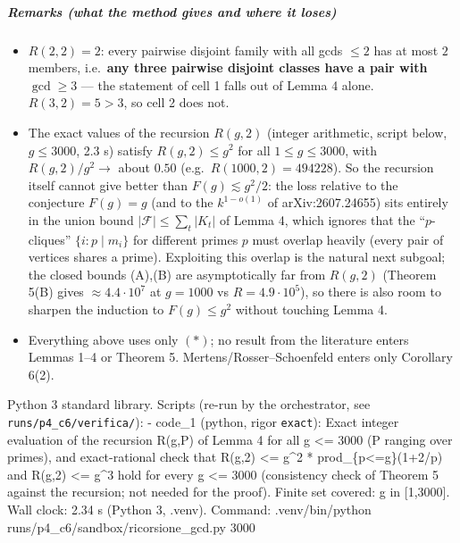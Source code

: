 \subparagraph{Remarks (what the method gives and where it
loses)}\label{remarks-what-the-method-gives-and-where-it-loses}

\begin{itemize}
\tightlist
\item
  \(R(2,2)=2\): every pairwise disjoint family with all gcds \(\le2\)
  has at most \(2\) members, i.e.~\textbf{any three pairwise disjoint
  classes have a pair with \(\gcd\ge3\)} --- the statement of cell 1
  falls out of Lemma 4 alone. \(R(3,2)=5>3\), so cell 2 does not.
\item
  The exact values of the recursion \(R(g,2)\) (integer arithmetic,
  script below, \(g\le3000\), 2.3 s) satisfy \(R(g,2)\le g^2\) for all
  \(1\le g\le 3000\), with \(R(g,2)/g^2\to\) about \(0.50\)
  (e.g.~\(R(1000,2)=494228\)). So the recursion itself cannot give
  better than \(F(g)\lesssim g^2/2\): the loss relative to the
  conjecture \(F(g)=g\) (and to the \(k^{1-o(1)}\) of arXiv:2607.24655)
  sits entirely in the union bound \(|\mathcal F|\le\sum_t|K_t|\) of
  Lemma 4, which ignores that the ``\(p\)-cliques'' \(\{i:p\mid m_i\}\)
  for different primes \(p\) must overlap heavily (every pair of
  vertices shares a prime). Exploiting this overlap is the natural next
  subgoal; the closed bounds (A),(B) are asymptotically far from
  \(R(g,2)\) (Theorem 5(B) gives \(\approx 4.4\cdot10^7\) at \(g=1000\)
  vs \(R=4.9\cdot10^5\)), so there is also room to sharpen the induction
  to \(F(g)\le g^2\) without touching Lemma 4.
\item
  Everything above uses only \((*)\); no result from the literature
  enters Lemmas 1--4 or Theorem 5. Mertens/Rosser--Schoenfeld enters
  only Corollary 6(2).
\end{itemize}


Python 3 standard library. Scripts (re-run by the orchestrator, see
\texttt{runs/p4\_c6/verifica/}): - code\_1 (python, rigor
\texttt{exact}): Exact integer evaluation of the recursion R(g,P) of
Lemma 4 for all g \textless= 3000 (P ranging over primes), and
exact-rational check that R(g,2) \textless= g\^{}2 *
prod\_\{p\textless=g\}(1+2/p) and R(g,2) \textless= g\^{}3 hold for
every g \textless= 3000 (consistency check of Theorem 5 against the
recursion; not needed for the proof). Finite set covered: g in
{[}1,3000{]}. Wall clock: 2.34 s (Python 3, .venv). Command:
.venv/bin/python runs/p4\_c6/sandbox/ricorsione\_gcd.py 3000


